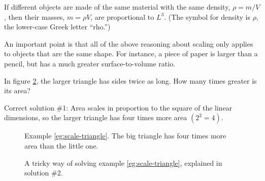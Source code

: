 If different objects are made of the same material with the
same density, $\rho =m/V$, then their masses, $m=\rho V$,
are proportional to $L^3$. (The
symbol for density is $\rho$, the lower-case Greek letter ``rho.'')

An important point is that all of the above reasoning about
scaling only applies to objects that are the same shape. For
instance, a piece of paper is larger than a pencil, but has
a much greater surface-to-volume ratio.

\begin{exmp}
\label{eg:scale-triangle} 
In figure \ref{eg-scale-triangle-1}, the larger triangle has sides twice as long. How many times greater is its area?

Correct solution \#1: Area scales in proportion to the
square of the linear dimensions, so the larger triangle has
four times more area $(2^2=4)$.

\begin{figure}[h]
\label{eg-scale-triangle-1} 
\begin{center}
\caption{ \qquad
 Example \ref{eg:scale-triangle}. The big triangle has four times more
 area than the little one.}
\end{center}
\end{figure}

\begin{figure}[h]
\label{eg-scale-triangle-1} 
\begin{center}
\caption{ \qquad
 A tricky way of solving example \ref{eg:scale-triangle}, explained in
 solution \#2.}
\end{center}
\end{figure}



\vspace{1.5mm}

\end{exmp}

